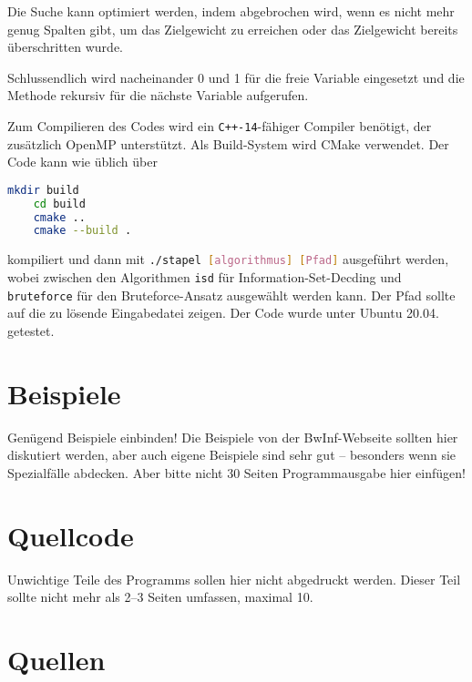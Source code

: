 \documentclass[a4paper,10pt,ngerman]{scrartcl}
\begin{document}
Die Suche kann optimiert werden, indem abgebrochen wird, wenn es nicht mehr genug Spalten gibt, um das Zielgewicht zu erreichen oder das Zielgewicht bereits überschritten wurde. 

Schlussendlich wird nacheinander 0 und 1 für die freie Variable eingesetzt und die Methode rekursiv für die nächste Variable aufgerufen. 

Zum Compilieren des Codes wird ein \texttt{C++-14}-fähiger Compiler benötigt, der zusätzlich OpenMP unterstützt.
Als Build-System wird CMake verwendet. 
Der Code kann wie üblich über 
\begin{lstlisting}[language=bash]
    mkdir build
    cd build
    cmake ..
    cmake --build . 
\end{lstlisting}    
kompiliert und dann mit \lstinline[language=bash]{./stapel [algorithmus] [Pfad]} ausgeführt werden, wobei zwischen den Algorithmen \lstinline{isd} für Information-Set-Decding und \lstinline{bruteforce} für den Bruteforce-Ansatz ausgewählt werden kann. Der Pfad sollte auf die zu lösende Eingabedatei zeigen. Der Code wurde unter Ubuntu 20.04. getestet.
\section{Beispiele}
Genügend Beispiele einbinden! Die Beispiele von der BwInf-Webseite sollten hier diskutiert werden, aber auch eigene Beispiele sind sehr gut – besonders wenn sie Spezialfälle abdecken. Aber bitte nicht 30 Seiten Programmausgabe hier einfügen!

\section{Quellcode}
Unwichtige Teile des Programms sollen hier nicht abgedruckt werden. Dieser Teil sollte nicht mehr als 2–3 Seiten umfassen, maximal 10.

\section{Quellen}
\printbibliography
\end{document}
